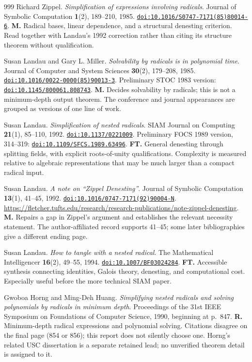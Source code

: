 \documentclass[11pt,a4paper]{article}
\newcommand{\doi}[1]{\href{https://doi.org/#1}{\nolinkurl{doi:#1}}}
\let\sourceurl\url
\theoremstyle{definition}
\theoremstyle{remark}
\numberwithin{equation}{section}
\begin{document}
\begin{thebibliography}{999}
Richard Zippel.
\emph{Simplification of expressions involving radicals}.
Journal of Symbolic Computation \textbf{1}(2), 189--210, 1985.
\doi{10.1016/S0747-7171(85)80014-6}.
\textbf{M.} Radical bases, linear dependence, and a structural denesting criterion. Read together with Landau's 1992 correction rather than citing its structure theorem without qualification.

Susan Landau and Gary L. Miller.
\emph{Solvability by radicals is in polynomial time}.
Journal of Computer and System Sciences \textbf{30}(2), 179--208, 1985.
\doi{10.1016/0022-0000(85)90013-3}.
Preliminary STOC 1983 version: \doi{10.1145/800061.808743}.
\textbf{M.} Decides solvability by radicals; this is not a minimum-depth output theorem. The conference and journal appearances are grouped as versions of one line of work.

Susan Landau.
\emph{Simplification of nested radicals}.
SIAM Journal on Computing \textbf{21}(1), 85--110, 1992.
\doi{10.1137/0221009}.
Preliminary FOCS 1989 version, 314--319: \doi{10.1109/SFCS.1989.63496}.
\textbf{FT.} General denesting through splitting fields, with explicit roots-of-unity qualifications. Complexity is measured relative to algebraic representations that may be much larger than a compact radical input.

Susan Landau.
\emph{A note on ``Zippel Denesting''}.
Journal of Symbolic Computation \textbf{13}(1), 41--45, 1992.
\doi{10.1016/0747-7171(92)90004-N}.
\sourceurl{https://fletcher.tufts.edu/research/research-publications/note-zippel-denesting}.
\textbf{M.} Repairs a gap in Zippel's argument and establishes the relevant necessity statement. The author-affiliated record supports 41--45; some later bibliographies give a different ending page.

Susan Landau.
\emph{How to tangle with a nested radical}.
The Mathematical Intelligencer \textbf{16}(2), 49--55, 1994.
\doi{10.1007/BF03024284}.
\textbf{FT.} Accessible synthesis connecting identities, Galois theory, denesting, and computational cost. Especially useful before the more technical SIAM paper.

Gwoboa Horng and Ming-Deh Huang.
\emph{Simplifying nested radicals and solving polynomials by radicals in minimum depth}.
Proceedings of the 31st IEEE Symposium on Foundations of Computer Science, 1990, beginning at p.~847.
\textbf{R.} Minimum-depth radical expressions and polynomial solving. Citations disagree on the final page (854 or 856); this report does not silently choose one. Horng's related USC dissertation is a separate retained lead; no unverified theorem detail is assigned to it.


\end{thebibliography}
\end{document}
